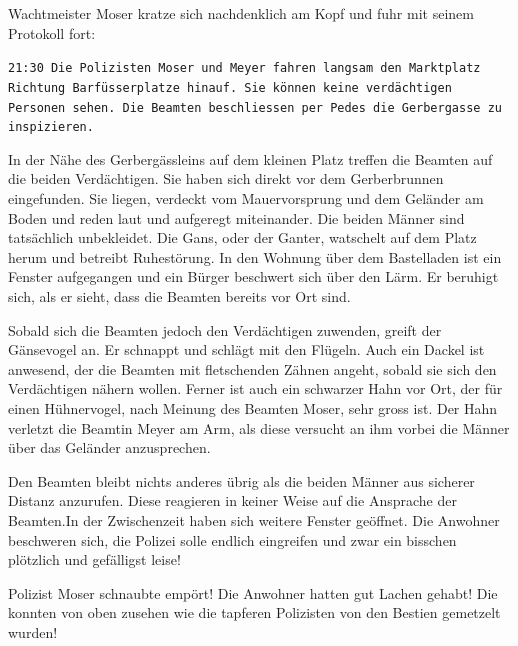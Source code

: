 \documentclass[11pt,titlepage,a5paper]{book}
\begin{document}
Wachtmeister Moser kratze sich nachdenklich am Kopf und fuhr mit seinem Protokoll fort:

{\tt 21:30 Die Polizisten Moser und Meyer fahren langsam den Marktplatz Richtung Barfüsserplatze hinauf. Sie können keine verdächtigen Personen sehen. Die Beamten beschliessen per Pedes die Gerbergasse zu inspizieren.

In der Nähe des Gerbergässleins auf dem kleinen Platz treffen die Beamten auf die beiden Verdächtigen. Sie haben sich direkt vor dem Gerberbrunnen eingefunden. Sie liegen, verdeckt vom Mauervorsprung und dem Geländer am Boden und reden laut und aufgeregt miteinander. Die beiden Männer sind tatsächlich unbekleidet. Die Gans, oder der Ganter, watschelt auf dem Platz herum und betreibt Ruhestörung. In den Wohnung über dem Bastelladen ist ein Fenster aufgegangen und ein Bürger beschwert sich über den Lärm. Er beruhigt sich, als er sieht, dass die Beamten bereits vor Ort sind. 

Sobald sich die Beamten jedoch den Verdächtigen zuwenden, greift der Gänsevogel an. Er schnappt und schlägt mit den Flügeln. Auch ein Dackel ist anwesend, der die Beamten mit fletschenden Zähnen angeht, sobald sie sich den Verdächtigen nähern wollen. Ferner ist auch ein schwarzer Hahn vor Ort, der für einen Hühnervogel, nach Meinung des Beamten Moser, sehr gross ist. Der Hahn verletzt die Beamtin Meyer am Arm, als diese versucht an ihm vorbei die Männer über das Geländer anzusprechen.

Den Beamten bleibt nichts anderes übrig als die beiden Männer aus sicherer Distanz anzurufen. Diese reagieren in keiner Weise auf die Ansprache der Beamten.In der Zwischenzeit haben sich weitere Fenster geöffnet. Die Anwohner beschweren sich, die Polizei solle endlich eingreifen und zwar ein bisschen plötzlich und gefälligst leise!}

Polizist Moser schnaubte empört! Die Anwohner hatten gut Lachen gehabt! Die konnten von oben zusehen wie die tapferen Polizisten von den Bestien gemetzelt wurden!
\end{document}
